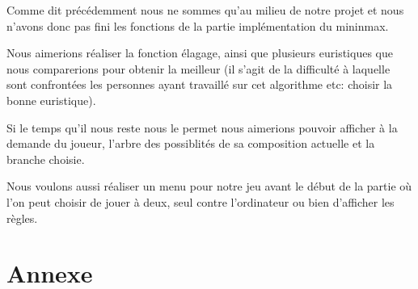 \documentclass[12,french]{report}
\begin{document}
Comme dit précédemment nous ne sommes qu'au milieu de notre projet
et nous n'avons donc pas fini les fonctions de la partie implémentation
du mininmax.

Nous aimerions réaliser la fonction élagage, ainsi que plusieurs euristiques
que nous comparerions pour obtenir la meilleur (il s'agit de la difficulté
à laquelle sont confrontées les personnes ayant travaillé sur cet
algorithme etc: choisir la bonne euristique).

Si le temps qu'il nous reste nous le permet nous aimerions pouvoir
afficher à la demande du joueur, l'arbre des possiblités de sa composition
actuelle et la branche choisie. 

Nous voulons aussi réaliser un menu pour notre jeu avant le début
de la partie où l'on peut choisir de jouer à deux, seul contre l'ordinateur
ou bien d'afficher les règles.


\chapter*{Annexe}
\end{document}
